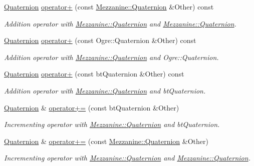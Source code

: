 \begin{DoxyCompactItemize}
\hyperlink{classMezzanine_1_1Quaternion}{Quaternion} \hyperlink{classMezzanine_1_1Quaternion_aaf72c453f146323b4375976bddfef251}{operator+} (const \hyperlink{classMezzanine_1_1Quaternion}{Mezzanine::Quaternion} \&Other) const 
\begin{DoxyCompactList}\small\item\em Addition operator with \hyperlink{classMezzanine_1_1Quaternion}{Mezzanine::Quaternion} and \hyperlink{classMezzanine_1_1Quaternion}{Mezzanine::Quaternion}. \item\end{DoxyCompactList}\item 
\hyperlink{classMezzanine_1_1Quaternion}{Quaternion} \hyperlink{classMezzanine_1_1Quaternion_a45d20e0911c4358d39d8366fdfa2cf07}{operator+} (const Ogre::Quaternion \&Other) const 
\begin{DoxyCompactList}\small\item\em Addition operator with \hyperlink{classMezzanine_1_1Quaternion}{Mezzanine::Quaternion} and Ogre::Quaternion. \item\end{DoxyCompactList}\item 
\hyperlink{classMezzanine_1_1Quaternion}{Quaternion} \hyperlink{classMezzanine_1_1Quaternion_afc830546de620e7dc45339fc403962ec}{operator+} (const btQuaternion \&Other) const 
\begin{DoxyCompactList}\small\item\em Addition operator with \hyperlink{classMezzanine_1_1Quaternion}{Mezzanine::Quaternion} and btQuaternion. \item\end{DoxyCompactList}\item 
\hyperlink{classMezzanine_1_1Quaternion}{Quaternion} \& \hyperlink{classMezzanine_1_1Quaternion_ad1e665374b5754c349db390b8e30e67b}{operator+=} (const btQuaternion \&Other)
\begin{DoxyCompactList}\small\item\em Incrementing operator with \hyperlink{classMezzanine_1_1Quaternion}{Mezzanine::Quaternion} and btQuaternion. \item\end{DoxyCompactList}\item 
\hyperlink{classMezzanine_1_1Quaternion}{Quaternion} \& \hyperlink{classMezzanine_1_1Quaternion_ae1a1849a067502e9a5dcc2082c593f24}{operator+=} (const \hyperlink{classMezzanine_1_1Quaternion}{Mezzanine::Quaternion} \&Other)
\begin{DoxyCompactList}\small\item\em Incrementing operator with \hyperlink{classMezzanine_1_1Quaternion}{Mezzanine::Quaternion} and \hyperlink{classMezzanine_1_1Quaternion}{Mezzanine::Quaternion}. \item\end{DoxyCompactList}\item 

\end{DoxyCompactItemize}
